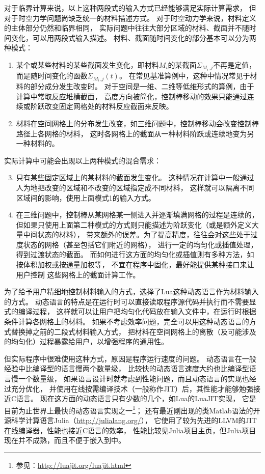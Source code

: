 对于临界计算来说，以上这种两段式的输入方式已经能够满足实际计算需求，
但对于时空力学问题尚缺乏统一的材料描述方式。
对于时空动力学来说，材料定义的主体部分仍然和临界相同，
实际问题中往往大部分区域的材料、截面并不随时间变化，可以用两段式输入描述。
材料、截面随时间变化的部分基本可以分为两种模式：
\begin{enumerate}
\item
某个或某些材料的某些截面发生变化，即材料$M_i$的某截面$\Sigma_{M_i,j}$不再是定值，
而是随时间变化的函数$\Sigma_{M_i,j}(t)$。
在常见基准算例中，这种中情况常见于材料的部分成分发生改变时。
对于空间是一维、二维等低维形式的算例，由于计算中常取反应堆横截面，
高度方向被简化，控制棒移动的效果只能通过连续或阶跃改变固定网格处的材料反应截面来反映。

\item
材料在空间网格上的分布发生改变，如三维问题中，控制棒移动会改变控制棒路径上各网格的材料，
这时各网格上的截面从一种材料阶跃或连续地变为另一种材料的。
\end{enumerate}
实际计算中可能会出现以上两种模式的混合需求：
\begin{enumerate}
\setcounter{enumi}{2}

\item 只有某些固定区域上的某材料的截面发生变化。
这种情况在计算中一般通过人为地把改变的区域和不改变的区域指定成不同材料，
这样就可以隔离不同区域间的影响，使用上面模式1的输入方式。

\item
在三维问题中，控制棒从某网格某一侧进入并逐渐填满网格的过程是连续的，
但如果只使用上面第二种模式的方式则只能描述为阶跃变化（或是额外定义大量中间状态的材料），
带来额外的误差。为了提高精度，往往会对这些处于过度状态的网格（甚至包括它们附近的网格），
进行一定的均匀化或插值处理，得到过渡状态的截面。
而如何进行这方面的均匀化或插值则有多种方法，如按体积加权或按通量加权等，
不宜在程序中固化，\ProgramName 最好能提供某种接口来让用户控制
这些网格上的截面计算工作。

\end{enumerate}

为了给予用户精细地控制材料输入的方式，\ProgramName 选择了Lua这种动态语言作为材料输入的方式。
动态语言的特点是在运行时可以直接读取程序源代码并执行而不需要显式的编译过程，
这样就可以让用户把均匀化代码放在输入文件中，在运行时根据条件计算各网格上的材料。
如果不考虑效率问题，完全可以用这种动态语言的方式替换掉之前的二段式材料输入方式，
把材料在空间网格上的离散（及可能涉及的均匀化）过程暴露给用户，以增强程序的通用性。

但实际程序中很难使用这种方式，原因是程序运行速度的问题。
动态语言在一般经验中比编译型的语言慢两个数量级，
比较快的动态语言速度大约也比编译型语言慢一个数量级，
如果语言设计时就考虑到性能问题，而且动态语言的实现也经过充分优化，
并使用在线按需编译技术（一般称作JIT）后，其性能才能够勉强接近C语言。
现在这方面的动态语言只有少数的几个，如Lua的LuaJIT实现，
它是目前为止世界上最快的动态语言实现之一\footnote{参见：\url{http://luajit.org/luajit.html}}；
还有最近刚出现的类Matlab语法的开源科学计算语言Julia（\url{http://julialang.org/}），
它使用了较为先进的LLVM的JIT在线编译器，性能也接近C语言的效率，
性能比较见Julia项目主页，但Julia项目现在并不成熟，而且不便于嵌入到\ProgramName 中。

